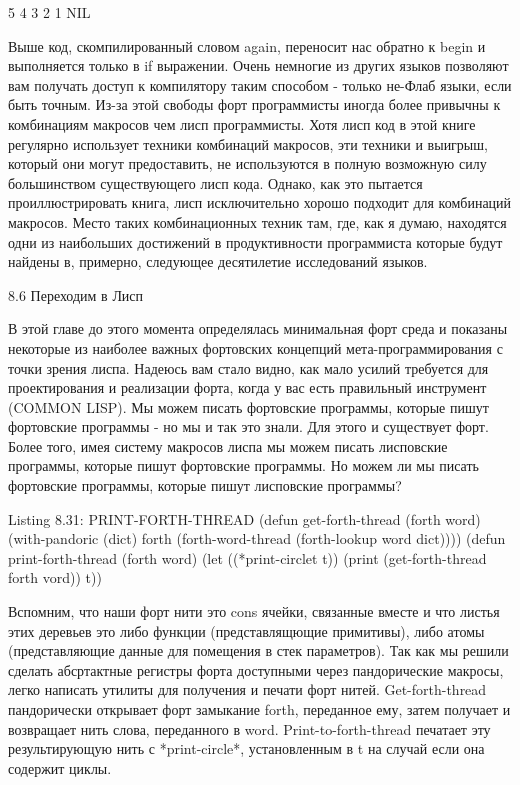 {{{5
4
3
2
1
NIL

Выше код, скомпилированный словом again, переносит нас обратно к begin и выполняется только в if выражении. Очень немногие из других языков позволяют вам получать доступ к компилятору таким способом - только не-Флаб языки, если быть точным. Из-за этой свободы форт программисты иногда более привычны к комбинациям макросов чем лисп программисты. Хотя лисп код в этой книге регулярно использует техники комбинаций макросов, эти техники и выигрыш, который они могут предоставить, не используются в полную возможную силу большинством существующего лисп кода. Однако, как это пытается проиллюстрировать книга, лисп исключительно хорошо подходит для комбинаций макросов. Место таких комбинационных техник там, где, как я думаю, находятся одни из наибольших достижений в продуктивности программиста которые будут найдены в, примерно, следующее десятилетие исследований языков.

8.6 Переходим в Лисп

В этой главе до этого момента определялась минимальная форт среда и показаны некоторые из наиболее важных фортовских концепций мета-программирования с точки зрения лиспа. Надеюсь вам стало видно, как мало усилий требуется для проектирования и реализации форта, когда у вас есть правильный инструмент (COMMON LISP). Мы можем писать фортовские программы, которые пишут фортовские программы - но мы и так это знали. Для этого и существует форт. Более того, имея систему макросов лиспа мы можем писать лисповские программы, которые пишут фортовские программы. Но можем ли мы писать фортовские программы, которые пишут лисповские программы?

Listing 8.31: PRINT-FORTH-THREAD
(defun get-forth-thread (forth word)
(with-pandoric (dict) forth
(forth-word-thread
(forth-lookup word dict))))
(defun print-forth-thread (forth word)
(let ((*print-circlet t))
(print (get-forth-thread forth vord))
t))

Вспомним, что наши форт нити это cons ячейки, связанные вместе и что листья этих деревьев это либо функции (представлящющие примитивы), либо атомы (представляющие данные для помещения в стек параметров). Так как мы решили сделать абсртактные регистры форта доступными через пандорические макросы, легко написать утилиты для получения и печати форт нитей. Get-forth-thread пандорически открывает форт замыкание forth, переданное ему, затем получает и возвращает нить слова, переданного в word. Print-to-forth-thread печатает эту результирующую нить с *print-circle*, установленным в t на случай если она содержит циклы.

}}}

